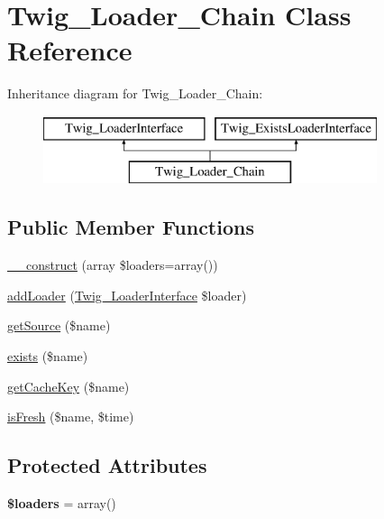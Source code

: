 \hypertarget{classTwig__Loader__Chain}{}\section{Twig\+\_\+\+Loader\+\_\+\+Chain Class Reference}
\label{classTwig__Loader__Chain}
Inheritance diagram for Twig\+\_\+\+Loader\+\_\+\+Chain\+:\begin{figure}[H]
\begin{center}
\leavevmode
\includegraphics[height=2.000000cm]{classTwig__Loader__Chain}
\end{center}
\end{figure}
\subsection*{Public Member Functions}
\begin{DoxyCompactItemize}
\item 
\hyperlink{classTwig__Loader__Chain_a7e4a52b0d3a3452492e25ffd0716c133}{\+\_\+\+\_\+construct} (array \$loaders=array())
\item 
\hyperlink{classTwig__Loader__Chain_a0b061d16d1ac289a96fe90d7a227a404}{add\+Loader} (\hyperlink{interfaceTwig__LoaderInterface}{Twig\+\_\+\+Loader\+Interface} \$loader)
\item 
\hyperlink{classTwig__Loader__Chain_af5230e22bb2aedabe6cfcde5937ec0d2}{get\+Source} (\$name)
\item 
\hyperlink{classTwig__Loader__Chain_ae0d58f9aa3f84502b5e1219a921fd87d}{exists} (\$name)
\item 
\hyperlink{classTwig__Loader__Chain_a9004de6aca1f01b435d8e589ff1e88f6}{get\+Cache\+Key} (\$name)
\item 
\hyperlink{classTwig__Loader__Chain_aacfd7c71e311f67fce90aadaed239c24}{is\+Fresh} (\$name, \$time)
\end{DoxyCompactItemize}
\subsection*{Protected Attributes}
\begin{DoxyCompactItemize}
\item 
{\bfseries \$loaders} = array()\hypertarget{classTwig__Loader__Chain_a96031406c73043fb48e63b6d0332cd61}{}\label{classTwig__Loader__Chain_a96031406c73043fb48e63b6d0332cd61}

\end{DoxyCompactItemize}


